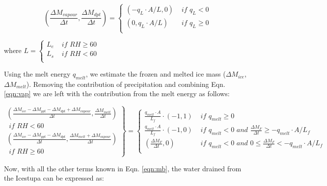 \documentclass[utf8]{frontiersSCNS} %
\begin{document}
\begin{equation} (\frac{\Delta M_{vapour}}{\Delta t}, \frac{\Delta M_{dpt}}{\Delta t}) = \left\{ \begin{array}{ll}
(-q_{L} \cdot A /L,0) & \textit{ if } q_{L}<0 \\ (0,q_{L} \cdot A /L) & \textit{ if } q_{L}\geq0 \\ \end{array}
\right.  \label{eqn:vap} \end{equation}

where $ L = \left\{ \begin{array}{ll} L_e & \textit{ if } RH\geq60\\ L_s & \textit{ if } RH<60 \\ \end{array} \right.
$

Using the melt energy $q_{melt}$, we estimate the frozen and melted ice mass ($\Delta M_{ice}$, $\Delta M_{melt}$).
Removing the contribution of precipitation and combining Eqn. \ref{eqn:vap} we are left with the contribution from the
melt energy as follows:

\begin{equation} \left.\begin{aligned} (\frac{\Delta M_{ice}-\Delta M_{ppt}-\Delta M_{dpt} + \Delta M_{vapour}}{\Delta
    t}, \frac{\Delta M_{melt}}{\Delta t})\\ \textit{ if } RH < 60\\ (\frac{\Delta M_{ice}-\Delta M_{ppt}-\Delta
  M_{dpt}}{\Delta t}, \frac{\Delta M_{melt}+ \Delta M_{vapour}}{\Delta t})\\ \textit{ if } RH \geq 60 \end{aligned}
\right\}= \left\{ \begin{array}{ll} \frac{q_{melt} \cdot A }{L_f} \cdot (-1, 1 )& \textit{ if } q_{melt} \geq 0 \\
\frac{q_{melt} \cdot A }{L_f} \cdot (-1, 0) & \textit{ if } q_{melt} < 0 \textit{ and } \frac{\Delta M_{F}}{\Delta t}
\geq -q_{melt}\cdot A/L_f  \\ (\frac{\Delta M_{F}}{\Delta t}, 0) & \textit{ if } q_{melt} < 0 \textit{ and } 0 \leq
\frac{\Delta M_{F}}{\Delta t} < -q_{melt}\cdot A/L_f\\ \end{array} \right.  \end{equation}

Now, with all the other terms known in Eqn. \ref{eqn:mb}, the water drained from the Icestupa can be expressed as: 
\end{document}
